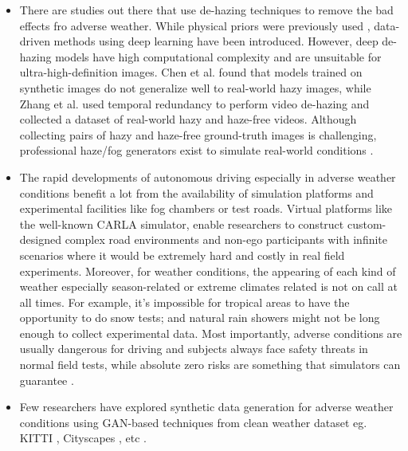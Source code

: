 \documentclass[rnd]{mas_proposal}
\begin{document}
\begin{itemize}
    \item There are studies out there that use de-hazing techniques to remove the bad effects fro adverse weather. While physical priors were previously used \cite{tan2008visibility} \cite{tarel2009fast}, data-driven methods using deep learning have been introduced. However, deep de-hazing models have high computational complexity and are unsuitable for ultra-high-definition images. Chen et al. \cite{chen2021psd} found that models trained on synthetic images do not generalize well to real-world hazy images, while Zhang et al. \cite{zhang2021learning} used temporal redundancy to perform video de-hazing and collected a dataset of real-world hazy and haze-free videos. Although collecting pairs of hazy and haze-free ground-truth images is challenging, professional haze/fog generators exist to simulate real-world conditions \cite{musat2021multi} \cite{timofte2018ntire}.

    \item The rapid developments of autonomous driving especially in adverse weather conditions benefit a lot from the availability of simulation platforms and experimental facilities like fog chambers or test roads. Virtual platforms like the well-known CARLA \cite{dosovitskiy2017carla} simulator, enable researchers to construct custom-designed complex road environments and non-ego participants with infinite scenarios where it would be extremely hard and costly in real field experiments. Moreover, for weather conditions, the appearing of each kind of weather especially season-related or extreme climates related is not on call at all times. For example, it’s impossible for tropical areas to have the opportunity to do snow tests; and natural rain showers might not be long enough to collect experimental data. Most importantly, adverse conditions are usually dangerous for driving and subjects always face safety threats in normal field tests, while absolute zero risks are something that simulators can guarantee \cite{Zhang2021Dec}.
    
    \item Few researchers have explored synthetic data generation for adverse weather conditions using GAN-based techniques from clean weather dataset eg. KITTI \cite{geiger2012we}, Cityscapes \cite{cordts2016cityscapes}, etc \cite{sun2021multi} \cite{zheng2020forkgan} \cite{lee2022perception}.


\end{itemize}
\end{document}
